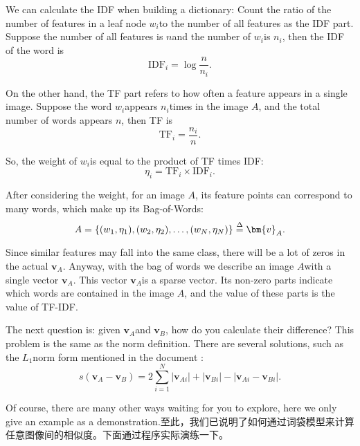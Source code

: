 We can calculate the IDF when building a dictionary: Count the ratio of the number of features in a leaf node $w_i $to the number of all features as the IDF part. Suppose the number of all features is $n $and the number of $w_i $is $n_i $, then the IDF of the word is
\begin{equation}
\mathrm{IDF}_i = \log \frac{n}{n_i}.
\end{equation}

On the other hand, the TF part refers to how often a feature appears in a single image. Suppose the word $w_i $appears $n_i $times in the image $A $, and the total number of words appears $n $, then TF is
\begin{equation}
\mathrm{TF}_i = \frac{n_i}{n}.
\end{equation}

So, the weight of $w_i $is equal to the product of TF times IDF:
\begin{equation}
\eta_i = \mathrm{TF}_i \times \mathrm{IDF}_i.
\end{equation}

After considering the weight, for an image $A $, its feature points can correspond to many words, which make up its Bag-of-Words:
\begin{equation}
A = \left\{ (w_1, \eta_1), (w_2, \eta_2), \ldots, (w_N, \eta_N)  \right\} \buildrel \Delta \over = \bm{v}_A.
\end{equation}

Since similar features may fall into the same class, there will be a lot of zeros in the actual $\bm{v} _A $. Anyway, with the bag of words we describe an image $A $with a single vector $\bm{v} _A $. This vector $\bm{v} _A $is a sparse vector. Its non-zero parts indicate which words are contained in the image $A $, and the value of these parts is the value of TF-IDF.

The next question is: given $\bm{v} _A $and $\bm{v} _B $, how do you calculate their difference? This problem is the same as the norm definition. There are several solutions, such as the $L_1 $norm form mentioned in the document \cite{Nister2006}:
\begin{equation}
s\left( {{\bm{v}_A} - {\bm{v}_B}} \right) = 2\sum\limits_{i = 1}^N {\left| {{\bm{v}_{Ai}}} \right| + \left| {{\bm{v}_{Bi}}} \right| - \left| {{\bm{v}_{Ai}} - {\bm{v}_{Bi}}} \right|}.
\end{equation}

Of course, there are many other ways waiting for you to explore, here we only give an example as a demonstration.至此，我们已说明了如何通过词袋模型来计算任意图像间的相似度。下面通过程序实际演练一下。

